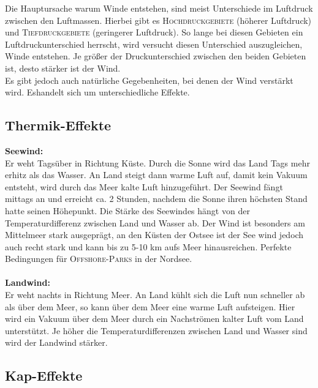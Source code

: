 \documentclass[12pt]{scrbook}
\begin{document}
Die Hauptursache warum Winde entstehen, sind meist Unterschiede im Luftdruck
zwischen den Luftmassen. Hierbei gibt es \textsc{Hochdruckgebiete} (höherer Luftdruck)
und \textsc{Tiefdruckgebiete} (geringerer Luftdruck). So lange bei diesen Gebieten ein
Luftdruckunterschied herrscht, wird versucht diesen Unterschied auszugleichen,
Winde entstehen. Je größer der Druckunterschied zwischen den beiden Gebieten
ist, desto stärker ist der Wind.\\

Es gibt jedoch auch natürliche Gegebenheiten, bei denen der Wind verstärkt wird. Eshandelt sich um unterschiedliche 
Effekte.

\subsection{Thermik-Effekte}

{\bfseries Seewind:} \\ 
Er weht Tagsüber in Richtung Küste. Durch die Sonne wird das Land Tags mehr
erhitz als das Wasser. An Land steigt dann warme Luft auf, damit kein Vakuum
entsteht, wird durch das Meer kalte Luft hinzugeführt. Der Seewind fängt
mittags an und erreicht ca. 2 Stunden, nachdem die Sonne ihren höchsten Stand
hatte seinen Höhepunkt. Die Stärke des Seewindes hängt von der
Temperaturdifferenz zwischen Land und Wasser ab. Der Wind ist besonders am
Mittelmeer stark ausgeprägt, an den Küsten der Ostsee ist der See wind jedoch
auch recht stark und kann bis zu 5-10 km aufs Meer hinausreichen. Perfekte
Bedingungen für \textsc{Offshore-Parks} in der Nordsee.\\
\\
{\bfseries Landwind:}\\  
Er weht nachts in Richtung Meer. An Land kühlt sich die Luft nun 
schneller ab als über dem Meer, so kann über dem Meer eine warme 
Luft aufsteigen. Hier wird ein Vakuum über dem Meer durch ein Nachströmen 
kalter Luft vom Land unterstützt. Je höher die Temperaturdifferenzen zwischen Land 
und Wasser sind wird der Landwind stärker.\\



\subsection{Kap-Effekte}
\end{document}
